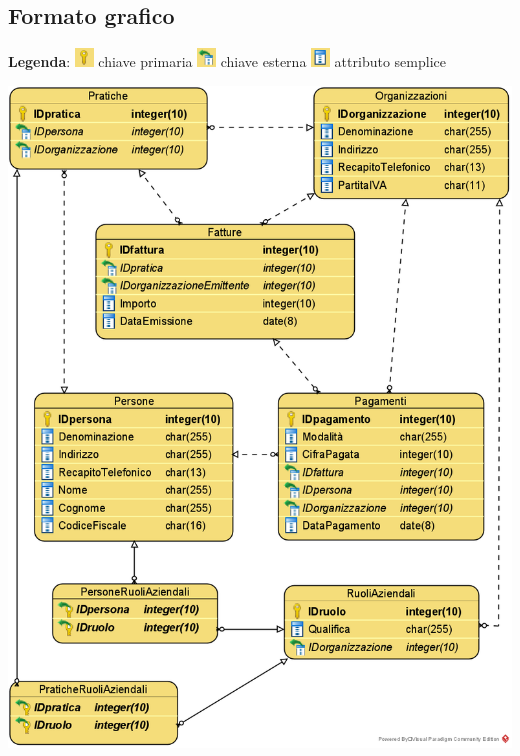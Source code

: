 \documentclass[a4paper,12pt]{article}
\begin{document}
 \subsection{ Formato grafico }

\begin{minipage}{\textwidth}
\textbf{Legenda}:
\includegraphics[width=0.5cm]{ Legenda chiave primaria.png } chiave primaria\hspace{1cm}
\includegraphics[width=0.5cm]{ Legenda chiave esterna.png } chiave esterna\hspace{1cm}
\includegraphics[width=0.5cm]{ Legenda attributo.png } attributo semplice

\begin{center}
\centering 
\centerline{
\includegraphics[width=\textwidth -4cm]{ Schema logico relazionale.png }
}
\end{center}
\end{minipage}
\end{document}
